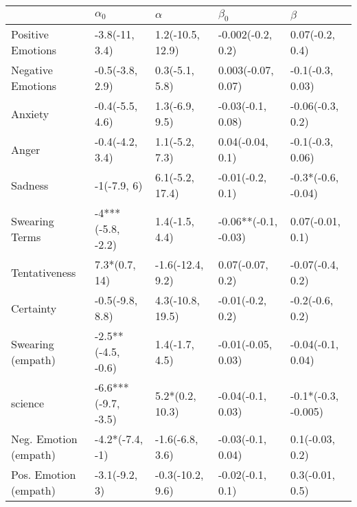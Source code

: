\begin{tabular}{lllll}
\toprule
{} &           $\alpha_0$ &          $\alpha$ &             $\beta_0$ &              $\beta$ \\
\midrule
Positive Emotions     &       -3.8(-11, 3.4) &  1.2(-10.5, 12.9) &     -0.002(-0.2, 0.2) &      0.07(-0.2, 0.4) \\
Negative Emotions     &      -0.5(-3.8, 2.9) &    0.3(-5.1, 5.8) &    0.003(-0.07, 0.07) &     -0.1(-0.3, 0.03) \\
Anxiety               &      -0.4(-5.5, 4.6) &    1.3(-6.9, 9.5) &     -0.03(-0.1, 0.08) &     -0.06(-0.3, 0.2) \\
Anger                 &      -0.4(-4.2, 3.4) &    1.1(-5.2, 7.3) &      0.04(-0.04, 0.1) &     -0.1(-0.3, 0.06) \\
Sadness               &          -1(-7.9, 6) &   6.1(-5.2, 17.4) &      -0.01(-0.2, 0.1) &   -0.3*(-0.6, -0.04) \\
Swearing Terms        &    -4***(-5.8, -2.2) &    1.4(-1.5, 4.4) &  -0.06**(-0.1, -0.03) &     0.07(-0.01, 0.1) \\
Tentativeness         &        7.3*(0.7, 14) &  -1.6(-12.4, 9.2) &      0.07(-0.07, 0.2) &     -0.07(-0.4, 0.2) \\
Certainty             &      -0.5(-9.8, 8.8) &  4.3(-10.8, 19.5) &      -0.01(-0.2, 0.2) &      -0.2(-0.6, 0.2) \\
Swearing (empath)     &   -2.5**(-4.5, -0.6) &    1.4(-1.7, 4.5) &    -0.01(-0.05, 0.03) &    -0.04(-0.1, 0.04) \\
science               &  -6.6***(-9.7, -3.5) &   5.2*(0.2, 10.3) &     -0.04(-0.1, 0.03) &  -0.1*(-0.3, -0.005) \\
Neg. Emotion (empath) &      -4.2*(-7.4, -1) &   -1.6(-6.8, 3.6) &     -0.03(-0.1, 0.04) &      0.1(-0.03, 0.2) \\
Pos. Emotion (empath) &        -3.1(-9.2, 3) &  -0.3(-10.2, 9.6) &      -0.02(-0.1, 0.1) &      0.3(-0.01, 0.5) \\
\bottomrule
\end{tabular}

